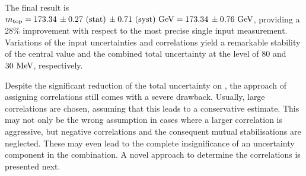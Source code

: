%
The final result is $m_{\mathrm{top}} = 173.34\,\pm 0.27~\mathrm{(stat)}\,\pm 0.71~\mathrm{(syst)}~\mathrm{GeV} = 173.34\,\pm 0.76~\mathrm{GeV}$, providing a 28\% improvement with respect to the most precise single input measurement. Variations of the input uncertainties and correlations yield a remarkable stability of the central value and the combined total uncertainty at the level of $80$ and $30~\mathrm{MeV}$, respectively. 
%




Despite the significant reduction of the total uncertainty on \mt, the approach of assigning correlations still comes with a severe drawback. 
%
Usually, large correlations are chosen, assuming that this leads to a conservative estimate. This may not only be the wrong assumption in cases where a larger correlation is aggressive, but negative correlations and the consequent mutual stabilisations are neglected. These may even lead to the complete insignificance of an uncertainty component in the combination.
%
A novel approach to determine the correlations is presented next.
%


















